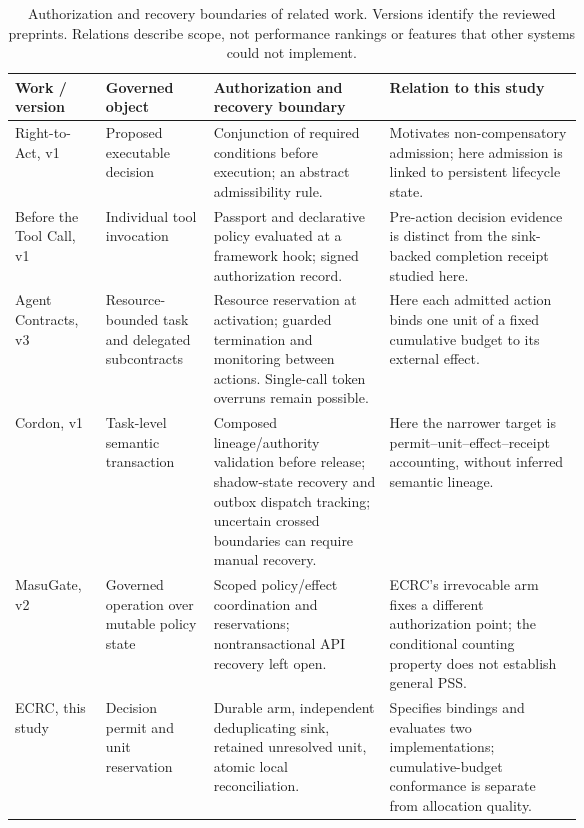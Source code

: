 \begin{table}[!htbp]
\centering
\caption{Authorization and recovery boundaries of related work. Versions identify the reviewed preprints. Relations describe scope, not performance rankings or features that other systems could not implement.}
\label{tab:closest_scope}
\small
\setlength{\tabcolsep}{4pt}
\renewcommand{\arraystretch}{1.14}
\begin{tabular}{@{}>{\raggedright\arraybackslash}p{0.16\linewidth}>{\raggedright\arraybackslash}p{0.19\linewidth}>{\raggedright\arraybackslash}p{0.31\linewidth}>{\raggedright\arraybackslash}p{}@{}}
\hline
Work / version & Governed object & Authorization and recovery boundary & Relation to this study \\
\hline
Right-to-Act, v1~\cite{lavi2026right} & Proposed executable decision & Conjunction of required conditions before execution; an abstract admissibility rule. & Motivates non-compensatory admission; here admission is linked to persistent lifecycle state. \\
Before the Tool Call, v1~\cite{uchibeke2026before} & Individual tool invocation & Passport and declarative policy evaluated at a framework hook; signed authorization record. & Pre-action decision evidence is distinct from the sink-backed completion receipt studied here. \\
Agent Contracts, v3~\cite{ye2026contracts} & Resource-bounded task and delegated subcontracts & Resource reservation at activation; guarded termination and monitoring between actions. Single-call token overruns remain possible. & Here each admitted action binds one unit of a fixed cumulative budget to its external effect. \\
Cordon, v1~\cite{chen2026cordon} & Task-level semantic transaction & Composed lineage/authority validation before release; shadow-state recovery and outbox dispatch tracking; uncertain crossed boundaries can require manual recovery. & Here the narrower target is permit--unit--effect--receipt accounting, without inferred semantic lineage. \\
MasuGate, v2~\cite{peng2026masugate} & Governed operation over mutable policy state & Scoped policy/effect coordination and reservations; nontransactional API recovery left open. & ECRC's irrevocable arm fixes a different authorization point; the conditional counting property does not establish general PSS. \\
ECRC, this study & Decision permit and unit reservation & Durable arm, independent deduplicating sink, retained unresolved unit, atomic local reconciliation. & Specifies bindings and evaluates two implementations; cumulative-budget conformance is separate from allocation quality. \\
\hline
\end{tabular}
\end{table}
